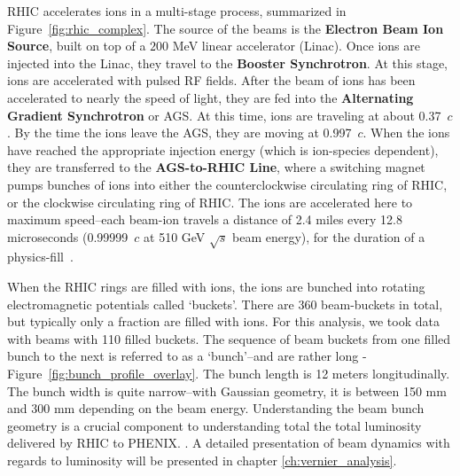 RHIC accelerates ions in a multi-stage process, summarized in
Figure~\ref{fig:rhic_complex}. The source of the beams is the \textbf{Electron
Beam Ion Source}, built on top of a $200$ MeV linear accelerator (Linac). Once
ions are injected into the Linac, they travel to the \textbf{Booster
Synchrotron}.  At this stage, ions are accelerated with pulsed RF fields. After
the beam of ions has been accelerated to nearly the speed of light, they are fed
into the \textbf{Alternating Gradient Synchrotron} or AGS. At this time, ions
are traveling at about 0.37~$c$. By the time the ions leave the AGS, they are
moving at 0.997~$c$. When the ions have reached the appropriate injection energy
(which is ion-species dependent), they are transferred to the
\textbf{AGS-to-RHIC Line}, where a switching magnet pumps bunches of ions into
either the counterclockwise circulating ring of RHIC, or the clockwise
circulating ring of RHIC. The ions are accelerated here to maximum speed--each
beam-ion travels a distance of 2.4 miles every 12.8 microseconds (0.99999~$c$ at
510 GeV $\sqrt{s}$ beam energy), for the duration of a
physics-fill~\cite{RHIC2016}.

When the RHIC rings are filled with ions, the ions are bunched into rotating
electromagnetic potentials called `buckets'. There are 360 beam-buckets in
total, but typically only a fraction are filled with ions. For this analysis, we
took data with beams with 110 filled buckets. The sequence of beam buckets from
one filled bunch to the next is referred to as a `bunch'--and are rather long -
Figure~\ref{fig:bunch_profile_overlay}. The bunch length is 12 meters
longitudinally. The bunch width is quite narrow--with Gaussian geometry, it is
between 150 mm and 300 mm depending on the beam energy.  Understanding the beam
bunch geometry is a crucial component to understanding total the total
luminosity delivered by RHIC to PHENIX. . A detailed presentation of beam
dynamics with regards to luminosity will be presented in chapter
\ref{ch:vernier_analysis}. 

